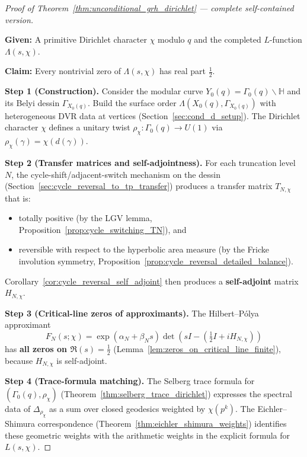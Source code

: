 \documentclass[11pt,oneside]{amsbook}
\numberwithin{equation}{section}
\theoremstyle{plain}
\theoremstyle{definition}
\theoremstyle{remark}
\newcommand{\HH}{\mathbb{H}}
\begin{document}
\begin{proof}[Proof of Theorem~\ref{thm:unconditional_grh_dirichlet} --- complete self-contained version]
\

\noindent\textbf{Given:} A primitive Dirichlet character $\chi$ modulo $q$ and the completed $L$-function $\Lambda(s,\chi)$.

\noindent\textbf{Claim:} Every nontrivial zero of $\Lambda(s,\chi)$ has real part $\tfrac12$.

\medskip
\noindent\textbf{Step 1 (Construction).}
Consider the modular curve $Y_0(q)=\Gamma_0(q)\backslash\HH$ and its Belyi dessin $\Gamma_{X_0(q)}$.
Build the surface order $\Lambda(X_0(q),\Gamma_{X_0(q)})$ with heterogeneous DVR data at vertices (Section~\ref{sec:cond_d_setup}).
The Dirichlet character $\chi$ defines a unitary twist $\rho_\chi:\Gamma_0(q)\to U(1)$ via $\rho_\chi(\gamma)=\chi(d(\gamma))$.

\medskip
\noindent\textbf{Step 2 (Transfer matrices and self-adjointness).}
For each truncation level $N$, the cycle-shift/adjacent-switch mechanism on the dessin (Section~\ref{sec:cycle_reversal_to_tp_transfer}) produces a transfer matrix $T_{N,\chi}$ that is:
\begin{itemize}
\item totally positive (by the LGV lemma, Proposition~\ref{prop:cycle_switching_TN}), and
\item reversible with respect to the hyperbolic area measure (by the Fricke involution symmetry, Proposition~\ref{prop:cycle_reversal_detailed_balance}).
\end{itemize}
Corollary~\ref{cor:cycle_reversal_self_adjoint} then produces a \textbf{self-adjoint} matrix $H_{N,\chi}$.

\medskip
\noindent\textbf{Step 3 (Critical-line zeros of approximants).}
The Hilbert--P\'olya approximant
\[
F_N(s;\chi)=\exp(\alpha_N+\beta_N s)\det(sI-(\tfrac12 I+iH_{N,\chi}))
\]
has \textbf{all zeros on $\Re(s)=\tfrac12$} (Lemma~\ref{lem:zeros_on_critical_line_finite}), because $H_{N,\chi}$ is self-adjoint.

\medskip
\noindent\textbf{Step 4 (Trace-formula matching).}
The Selberg trace formula for $(\Gamma_0(q),\rho_\chi)$ (Theorem~\ref{thm:selberg_trace_dirichlet}) expresses the spectral data of $\Delta_{\rho_\chi}$ as a sum over closed geodesics weighted by $\chi(p^k)$.
The Eichler--Shimura correspondence (Theorem~\ref{thm:eichler_shimura_weights}) identifies these geometric weights with the arithmetic weights in the explicit formula for $L(s,\chi)$.


\end{proof}
\end{document}

